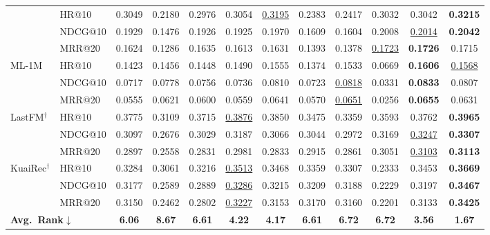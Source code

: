 \documentclass[sigconf,review,anonymous]{acmart}
\newcommand{\tblbest}[1]{\textbf{#1}}
\newcommand{\tblsecond}[1]{\underline{#1}}
\begin{document}
\begin{table}[!b]
{\begin{tabular}{ll*{9}{c}>{\columncolor{routerecgray}}c}
      & HR@10   & 0.3049 & 0.2180 & 0.2976 & 0.3054 & \tblsecond{0.3195} & 0.2383 & 0.2417 & 0.3032 & 0.3042 & \tblbest{0.3215} \\
      & NDCG@10 & 0.1929 & 0.1476 & 0.1926 & 0.1925 & 0.1970 & 0.1609 & 0.1604 & 0.2008 & \tblsecond{0.2014} & \tblbest{0.2042} \\
      & MRR@20  & 0.1624 & 0.1286 & 0.1635 & 0.1613 & 0.1631 & 0.1393 & 0.1378 & \tblsecond{0.1723} & \tblbest{0.1726} & 0.1715 \\
    \midrule
    \multirow{3}{*}{ML-1M}
      & HR@10   & 0.1423 & 0.1456 & 0.1448 & 0.1490 & 0.1555 & 0.1374 & 0.1533 & 0.0669 & \tblbest{0.1606} & \tblsecond{0.1568} \\
      & NDCG@10 & 0.0717 & 0.0778 & 0.0756 & 0.0736 & 0.0810 & 0.0723 & \tblsecond{0.0818} & 0.0331 & \tblbest{0.0833} & 0.0807 \\
      & MRR@20  & 0.0555 & 0.0621 & 0.0600 & 0.0559 & 0.0641 & 0.0570 & \tblsecond{0.0651} & 0.0256 & \tblbest{0.0655} & 0.0631 \\
    \midrule
    \multirow{3}{*}{LastFM$^\dagger$}
      & HR@10   & 0.3775 & 0.3109 & 0.3715 & \tblsecond{0.3876} & 0.3850 & 0.3475 & 0.3359 & 0.3593 & 0.3762 & \tblbest{0.3965} \\
      & NDCG@10 & 0.3097 & 0.2676 & 0.3029 & 0.3187 & 0.3066 & 0.3044 & 0.2972 & 0.3169 & \tblsecond{0.3247} & \tblbest{0.3307} \\
      & MRR@20  & 0.2897 & 0.2558 & 0.2831 & 0.2981 & 0.2833 & 0.2915 & 0.2861 & 0.3051 & \tblsecond{0.3103} & \tblbest{0.3113} \\
    \midrule
    \multirow{3}{*}{KuaiRec$^\dagger$}
      & HR@10   & 0.3284 & 0.3061 & 0.3216 & \tblsecond{0.3513} & 0.3468 & 0.3359 & 0.3307 & 0.2333 & 0.3453 & \tblbest{0.3669} \\
      & NDCG@10 & 0.3177 & 0.2589 & 0.2889 & \tblsecond{0.3286} & 0.3215 & 0.3209 & 0.3188 & 0.2229 & 0.3197 & \tblbest{0.3467} \\
      & MRR@20  & 0.3150 & 0.2462 & 0.2802 & \tblsecond{0.3227} & 0.3153 & 0.3170 & 0.3160 & 0.2201 & 0.3133 & \tblbest{0.3425} \\
    \midrule
    \multicolumn{2}{l}{\textbf{Avg.~Rank$\downarrow$}} & \textbf{6.06} & \textbf{8.67} & \textbf{6.61} & \textbf{4.22} & \textbf{4.17} & \textbf{6.61} & \textbf{6.72} & \textbf{6.72} & \textbf{3.56} & \textbf{1.67} \\
    \bottomrule
  \end{tabular}}
\end{table}
\end{document}
